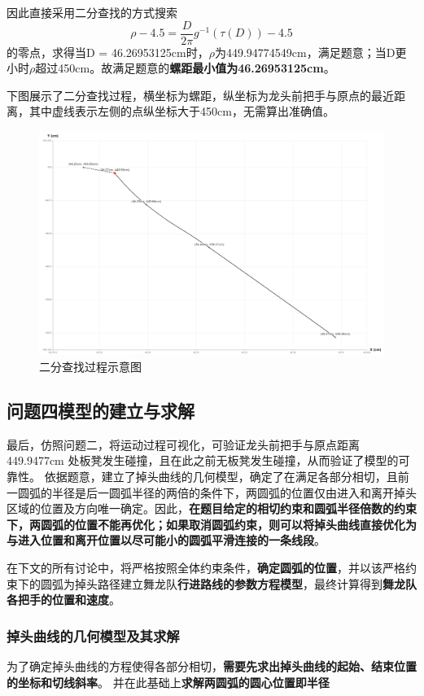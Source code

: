 \documentclass[a4paper]{article}
\begin{document}
        因此直接采用二分查找的方式搜索$$\rho -4.5 = \frac{D}{2 \pi} g^{-1}(\tau(D)) - 4.5$$的零点，求得当D = 46.26953125cm时，$\rho$为449.94774549cm，满足题意；当D更小时$\rho$超过450cm。故满足题意的\textbf{螺距最小值为46.26953125cm}。

        下图展示了二分查找过程，横坐标为螺距，纵坐标为龙头前把手与原点的最近距离，其中虚线表示左侧的点纵坐标大于450cm，无需算出准确值。
 \begin{figure}[h]
     \centering
     \includegraphics[width=0.5\linewidth]{image/search_3.png}
     \caption{二分查找过程示意图}
     \label{fig:enter-label5}
 \end{figure}
	\subsection{问题四模型的建立与求解}
最后，仿照问题二，将运动过程可视化，可验证龙头前把手与原点距离 449.9477cm 处板凳发生碰撞，且在此之前无板凳发生碰撞，从而验证了模型的可靠性。
		依据题意，建立了掉头曲线的几何模型，确定了在满足各部分相切，且前一圆弧的半径是后一圆弧半径的两倍的条件下，两圆弧的位置仅由进入和离开掉头区域的位置及方向唯一确定。因此，\textbf{在题目给定的相切约束和圆弧半径倍数的约束下，两圆弧的位置不能再优化；如果取消圆弧约束，则可以将掉头曲线直接优化为与进入位置和离开位置以尽可能小的圆弧平滑连接的一条线段}。

        在下文的所有讨论中，将严格按照全体约束条件，\textbf{确定圆弧的位置}，并以该严格约束下的圆弧为掉头路径建立舞龙队\textbf{行进路线的参数方程模型}，最终计算得到\textbf{舞龙队各把手的位置和速度}。%

		\subsubsection{掉头曲线的几何模型及其求解}

		为了确定掉头曲线的方程使得各部分相切，\textbf{需要先求出掉头曲线的起始、结束位置的坐标和切线斜率}。
		并在此基础上\textbf{求解两圆弧的圆心位置即半径}
\end{document}
